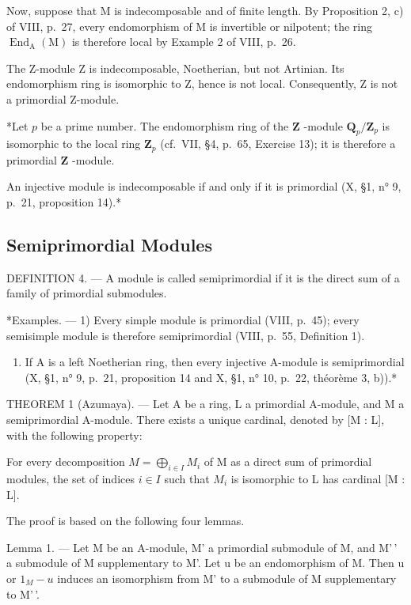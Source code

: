 Now, suppose that M is indecomposable and of finite length. By Proposition 2, c) of VIII, p.~27, every endomorphism of M is invertible or nilpotent; the ring \(\operatorname{End}_{\mathrm{A}}(\mathrm{M})\) is therefore local by Example 2 of VIII, p.~26.

The Z-module Z is indecomposable, Noetherian, but not Artinian. Its endomorphism ring is isomorphic to Z, hence is not local. Consequently, Z is not a primordial Z-module.

*Let \(p\) be a prime number. The endomorphism ring of the \(\mathbf{Z}\) -module \(\mathbf{Q}_p / \mathbf{Z}_p\) is isomorphic to the local ring \(\mathbf{Z}_p\) (cf.~VII, §4, p.~65, Exercise 13); it is therefore a primordial \(\mathbf{Z}\) -module.

An injective module is indecomposable if and only if it is primordial (X, §1, n° 9, p.~21, proposition 14).*

\subsection{Semiprimordial Modules}

DEFINITION 4. --- A module is called semiprimordial if it is the direct sum of a family of primordial submodules.

*Examples. --- 1) Every simple module is primordial (VIII, p.~45); every semisimple module is therefore semiprimordial (VIII, p.~55, Definition 1).

\begin{enumerate}
\def\labelenumi{\arabic{enumi})}
\setcounter{enumi}{1}
\tightlist
\item
  If A is a left Noetherian ring, then every injective A-module is semiprimordial (X, §1, n° 9, p.~21, proposition 14 and X, §1, n° 10, p.~22, théorème 3, b)).*
\end{enumerate}

THEOREM 1 (Azumaya). --- Let A be a ring, L a primordial A-module, and M a semiprimordial A-module. There exists a unique cardinal, denoted by {[}M : L{]}, with the following property:

For every decomposition \(M = \bigoplus_{i \in I} M_i\) of M as a direct sum of primordial modules, the set of indices \(i \in I\) such that \(M_i\) is isomorphic to L has cardinal {[}M : L{]}.

The proof is based on the following four lemmas.

Lemma 1. --- Let M be an A-module, M' a primordial submodule of M, and M'\,' a submodule of M supplementary to M'. Let u be an endomorphism of M. Then u or \(1_{M} - u\) induces an isomorphism from M' to a submodule of M supplementary to M'\,'.

